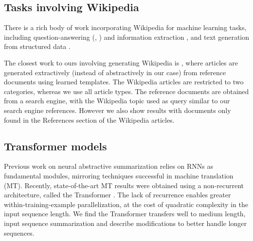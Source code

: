 \subsection{Tasks involving Wikipedia}
There is a rich body of work incorporating Wikipedia for machine learning tasks, including
question-answering (\citet{hewlett2016wikireading}, \citet{rajpurkar2016squad}) and
information extraction \citep{lehmann2015dbpedia}, and text generation from 
structured data 
\citep{Lebret2016}.

The closest work to ours involving generating Wikipedia is \cite{Sauper2009},
where articles are generated extractively (instead of abstractively in our case)
from reference documents using learned
templates. The Wikipedia articles are restricted to two categories, whereas we
use all article types. The reference documents are obtained from a search engine,
with the Wikipedia topic used as query similar to our search engine references.
However we also show results with documents only found in the
References section of the Wikipedia articles.

\subsection{Transformer models} \label{related_transformer}
Previous work on neural abstractive summarization relies on RNNs as
fundamental modules, mirroring techniques successful
in machine translation (MT).
Recently, state-of-the-art MT results were obtained using a
non-recurrent architecture, called the Transformer \citep{vaswani2017attention}.
The lack of recurrence enables greater within-training-example parallelization,
at the cost of quadratic complexity in the input sequence length.
We find the Transformer transfers well to medium length, input sequence
summarization and describe modifications to better handle longer sequences.


